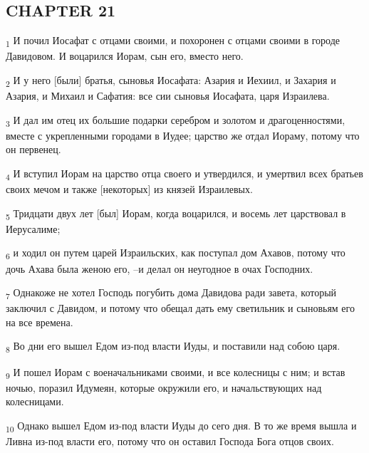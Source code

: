 \subsection{CHAPTER 21}
\begin{tcolorbox}
\textsubscript{1} И почил Иосафат с отцами своими, и похоронен с отцами своими в городе Давидовом. И воцарился Иорам, сын его, вместо него.
\end{tcolorbox}
\begin{tcolorbox}
\textsubscript{2} И у него [были] братья, сыновья Иосафата: Азария и Иехиил, и Захария и Азария, и Михаил и Сафатия: все сии сыновья Иосафата, царя Израилева.
\end{tcolorbox}
\begin{tcolorbox}
\textsubscript{3} И дал им отец их большие подарки серебром и золотом и драгоценностями, вместе с укрепленными городами в Иудее; царство же отдал Иораму, потому что он первенец.
\end{tcolorbox}
\begin{tcolorbox}
\textsubscript{4} И вступил Иорам на царство отца своего и утвердился, и умертвил всех братьев своих мечом и также [некоторых] из князей Израилевых.
\end{tcolorbox}
\begin{tcolorbox}
\textsubscript{5} Тридцати двух лет [был] Иорам, когда воцарился, и восемь лет царствовал в Иерусалиме;
\end{tcolorbox}
\begin{tcolorbox}
\textsubscript{6} и ходил он путем царей Израильских, как поступал дом Ахавов, потому что дочь Ахава была женою его, --и делал он неугодное в очах Господних.
\end{tcolorbox}
\begin{tcolorbox}
\textsubscript{7} Однакоже не хотел Господь погубить дома Давидова ради завета, который заключил с Давидом, и потому что обещал дать ему светильник и сыновьям его на все времена.
\end{tcolorbox}
\begin{tcolorbox}
\textsubscript{8} Во дни его вышел Едом из-под власти Иуды, и поставили над собою царя.
\end{tcolorbox}
\begin{tcolorbox}
\textsubscript{9} И пошел Иорам с военачальниками своими, и все колесницы с ним; и встав ночью, поразил Идумеян, которые окружили его, и начальствующих над колесницами.
\end{tcolorbox}
\begin{tcolorbox}
\textsubscript{10} Однако вышел Едом из-под власти Иуды до сего дня. В то же время вышла и Ливна из-под власти его, потому что он оставил Господа Бога отцов своих.
\end{tcolorbox}
